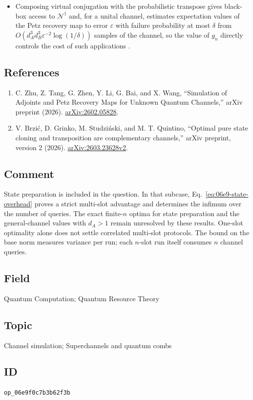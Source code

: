 \begin{itemize}
  \item Composing virtual conjugation with the probabilistic transpose
  gives black-box access to $\mathcal N^{\dagger}$ and, for a unital
  channel, estimates expectation values of the Petz recovery map to error
  $\varepsilon$ with failure probability at most $\delta$ from
  $O(d_A^{3}d_B^{3}\varepsilon^{-2}\log(1/\delta))$ samples of the channel,
  so the value of $g_n$ directly controls the cost of such applications
  .
\end{itemize}

\subsection*{References}

\begin{enumerate}[label={},leftmargin=4.8em,labelsep=0.5em]
  \footnotesize
  \item[\textup{[ZTZ+26]}]\label{ref:06e9-zhu-et-al}
  C. Zhu, Z. Tang, G. Zhen, Y. Li, G. Bai, and X. Wang, ``Simulation of
  Adjoints and Petz Recovery Maps for Unknown Quantum Channels,'' arXiv
  preprint (2026).
  \href{https://arxiv.org/abs/2602.05828}{arXiv:2602.05828}.

  \item[\textup{[BGSQ26]}]\label{ref:06e9-brzic-et-al}
  V. Brzi\'c, D. Grinko, M. Studzi\'nski, and M. T. Quintino,
“Optimal pure state cloning and transposition are complementary channels,”
arXiv preprint, version 2 (2026).
\href{https://arxiv.org/abs/2603.23628v2}{arXiv:2603.23628v2}.
\end{enumerate}

\subsection*{Comment}

State preparation is included in the question. In that subcase,
Eq.~\eqref{eq:06e9-state-overhead} proves a strict multi-slot advantage and
determines the infimum over the number of queries. The exact finite-$n$
optima for state preparation and the general-channel values with $d_A>1$
remain unresolved by these results. One-slot optimality alone does not
settle correlated multi-slot protocols. The bound on the base norm measures
variance per run; each $n$-slot run itself consumes $n$ channel queries.

\subsection*{Field}

Quantum Computation; Quantum Resource Theory

\subsection*{Topic}

Channel simulation; Superchannels and quantum combs

\subsection*{ID}

\texttt{op\_06e9f0c7b3b62f3b}
